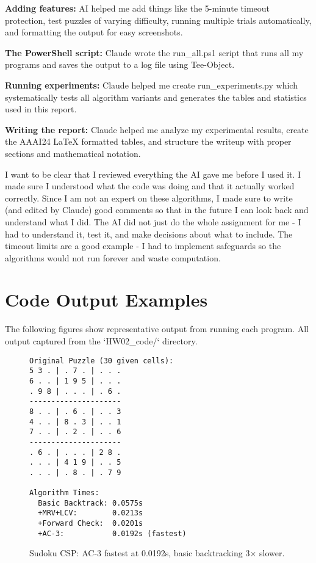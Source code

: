 \documentclass[letterpaper]{article}
\begin{document}
\textbf{Adding features:} AI helped me add things like the 5-minute timeout protection, test puzzles of varying difficulty, running multiple trials automatically, and formatting the output for easy screenshots.

\textbf{The PowerShell script:} Claude wrote the run\_all.ps1 script that runs all my programs and saves the output to a log file using Tee-Object.

\textbf{Running experiments:} Claude helped me create run\_experiments.py which systematically tests all algorithm variants and generates the tables and statistics used in this report.

\textbf{Writing the report:} Claude helped me analyze my experimental results, create the AAAI24 LaTeX formatted tables, and structure the writeup with proper sections and mathematical notation.

I want to be clear that I reviewed everything the AI gave me before I used it. I made sure I understood what the code was doing and that it actually worked correctly. Since I am not an expert on these algorithms, I made sure to write (and edited by Claude) good comments so that in the future I can look back and understand what I did. The AI did not just do the whole assignment for me - I had to understand it, test it, and make decisions about what to include. The timeout limits are a good example - I had to implement safeguards so the algorithms would not run forever and waste computation.

\section{Code Output Examples}

The following figures show representative output from running each program. All output captured from the `HW02\_code/` directory.

\begin{figure}[h]
\begin{scriptsize}
\begin{verbatim}
Original Puzzle (30 given cells):
5 3 . | . 7 . | . . .
6 . . | 1 9 5 | . . .
. 9 8 | . . . | . 6 .
---------------------
8 . . | . 6 . | . . 3
4 . . | 8 . 3 | . . 1
7 . . | . 2 . | . . 6
---------------------
. 6 . | . . . | 2 8 .
. . . | 4 1 9 | . . 5
. . . | . 8 . | . 7 9

Algorithm Times:
  Basic Backtrack: 0.0575s
  +MRV+LCV:        0.0213s
  +Forward Check:  0.0201s
  +AC-3:           0.0192s (fastest)
\end{verbatim}
\end{scriptsize}
\caption{Sudoku CSP: AC-3 fastest at 0.0192s, basic backtracking 3× slower.}
\label{fig:sudoku-csp}
\end{figure}
\end{document}
